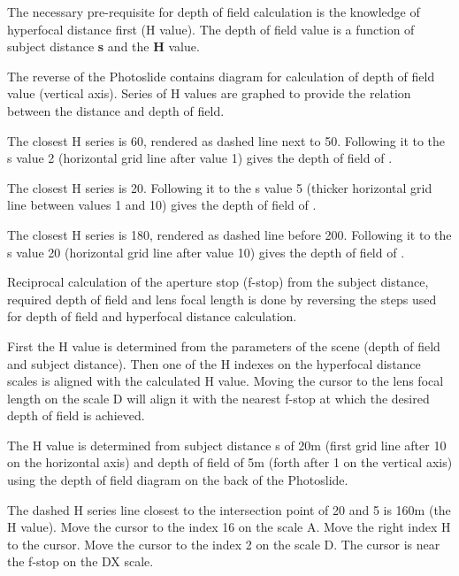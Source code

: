 \begin{multicols*}{3}
{  

The necessary pre-requisite for depth of field calculation is the knowledge of hyperfocal distance first (H value).
The depth of field value is a function of subject distance \textbf{s} and the \textbf{H} value.

The reverse of the Photoslide contains diagram for calculation of depth of field value (vertical axis).
Series of H values are graphed to provide the relation between the distance and depth of field. 

The closest H series is 60, rendered as dashed line next to 50.
Following it to the s value 2 (horizontal grid line after value 1) gives the depth of field of .

The closest H series is 20.
Following it to the s value 5 (thicker horizontal grid line between values 1 and 10) gives the depth of field of .

The closest H series is 180, rendered as dashed line before 200.
Following it to the s value 20 (horizontal grid line after value 10) gives the depth of field of .

\vfill\columnbreak

Reciprocal calculation of the aperture stop (f-stop) from the subject distance, required depth of field and lens focal length is done by reversing the steps used for depth of field and hyperfocal distance calculation.

First the H value is determined from the parameters of the scene (depth of field and subject distance).
Then one of the H indexes on the hyperfocal distance scales is aligned with the calculated H value.
Moving the cursor to the lens focal length on the scale D will align it with the nearest f-stop at which the desired depth of field is achieved.

\footnotesize The H value is determined from subject distance s of 20m (first grid line after 10 on the horizontal axis) and depth of field of 5m (forth after 1 on the vertical axis) using the depth of field diagram on the back of the Photoslide.

The dashed H series line closest to the intersection point of 20 and 5 is 160m (the H value).
Move the cursor to the index 16 on the scale A.
Move the right index H to the cursor.
Move the cursor to the index 2 on the scale D.
The cursor is near the f-stop  on the DX scale.
  }
  \end{multicols*}
  

